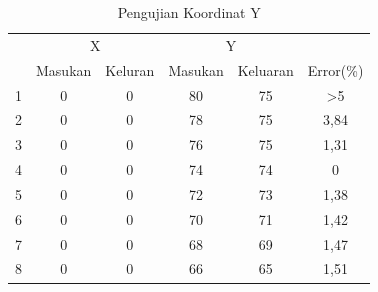 \fontsize{8}{10}\selectfont
\begin{longtable}{|c|c|c|c|c|c|}
	\caption{Pengujian Koordinat Y}
	\label{tbl.y}\\
	\hline
	\rowcolor[HTML]{9B9B9B} 
	\cellcolor[HTML]{9B9B9B}                     & \multicolumn{2}{c|}{\cellcolor[HTML]{9B9B9B}X} & \multicolumn{2}{c|}{\cellcolor[HTML]{9B9B9B}Y} & \cellcolor[HTML]{9B9B9B}                           \\ \cline{2-5}
	\rowcolor[HTML]{9B9B9B} 
	\multirow{-2}{*}{\cellcolor[HTML]{9B9B9B}No} & Masukan                & Keluran               & Masukan               & Keluaran               & \multirow{-2}{*}{\cellcolor[HTML]{9B9B9B}Error(\%)} \\ \hline
	\endfirsthead
	\endhead
	1                                            & 0                      & 0                     & 80                    & 75                     & >5                                               \\ \hline
	2                                            & 0                      & 0                     & 78                    & 75                     & 3,84                                       \\ \hline
	3                                            & 0                      & 0                     & 76                    & 75                     & 1,31                                       \\ \hline
	4                                            & 0                      & 0                     & 74                    & 74                     & 0                                                  \\ \hline
	5                                            & 0                      & 0                     & 72                    & 73                     & 1,38                                     \\ \hline
	6                                            & 0                      & 0                     & 70                    & 71                     & 1,42                                       \\ \hline
	7                                            & 0                      & 0                     & 68                    & 69                     & 1,47                                       \\ \hline
	8                                            & 0                      & 0                     & 66                    & 65                     & 1,51                                        \\ \hline

\end{longtable}
